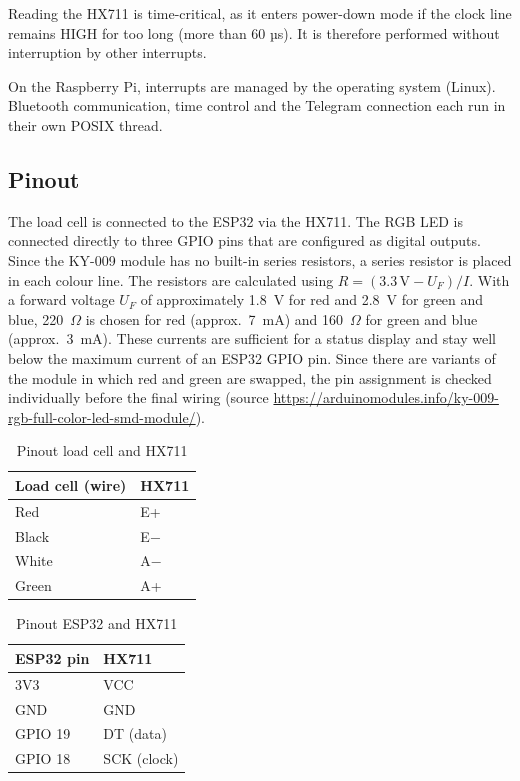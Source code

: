 Reading the HX711 is time-critical, as it enters power-down mode if the clock
line remains HIGH for too long (more than 60 µs). It is therefore performed
without interruption by other interrupts.

On the Raspberry Pi, interrupts are managed by the operating system (Linux).
Bluetooth communication, time control and the Telegram connection each run
in their own POSIX thread.

\subsection{Pinout}

The load cell is connected to the ESP32 via the HX711. The RGB LED is
connected directly to three GPIO pins that are configured as digital outputs.
Since the KY-009 module has no built-in series resistors, a series resistor is
placed in each colour line. The resistors are calculated using
$R = (3.3\,\mathrm{V} - U_F) / I$. With a forward voltage $U_F$ of
approximately 1.8~V for red and 2.8~V for green and blue, 220~$\Omega$ is
chosen for red (approx.\ 7~mA) and 160~$\Omega$ for green and blue
(approx.\ 3~mA). These currents are sufficient for a status display and stay
well below the maximum current of an ESP32 GPIO pin. Since there are variants of the module in which red
and green are swapped, the pin assignment is checked individually before the
final wiring (source
\url{https://arduinomodules.info/ky-009-rgb-full-color-led-smd-module/}).

\begin{table}[H]
	\centering
	\begin{tabular}{|l|l|}
		\hline
		Load cell (wire) & HX711 \\
		\hline
		Red & E+ \\
		Black & E$-$ \\
		White & A$-$ \\
		Green & A+ \\
		\hline
	\end{tabular}
	\caption{Pinout load cell and HX711}
	\label{tab:pinout-loadcell}
\end{table}

\begin{table}[H]
	\centering
	\begin{tabular}{|l|l|}
		\hline
		ESP32 pin & HX711 \\
		\hline
		3V3 & VCC \\
		GND & GND \\
		GPIO 19 & DT (data) \\
		GPIO 18 & SCK (clock) \\
		\hline
	\end{tabular}
	\caption{Pinout ESP32 and HX711}
	\label{tab:pinout-hx711}
\end{table}

